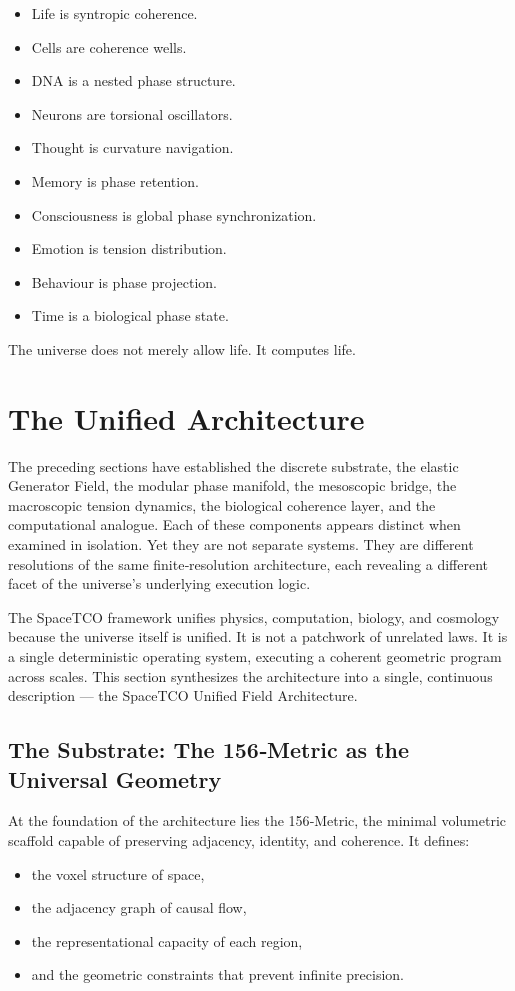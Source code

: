 \documentclass[reprint,amsmath,amssymb,aps,prl,floatfix]{revtex4-2}
\begin{document}
\begin{itemize}
\begin{itemize}
\item Life is syntropic coherence.
\item Cells are coherence wells.  
\item DNA is a nested phase structure.  
\item Neurons are torsional oscillators.  
\item Thought is curvature navigation.  
\item Memory is phase retention.  
\item Consciousness is global phase synchronization.  
\item Emotion is tension distribution.  
\item Behaviour is phase projection.  
\item Time is a biological phase state.
\end{itemize}
\medskip
The universe does not merely allow life.  
It computes life.

\section{The Unified Architecture}

The preceding sections have established the discrete substrate, the elastic Generator Field, the modular phase manifold, the mesoscopic bridge, the macroscopic tension dynamics, the biological coherence layer, and the computational analogue. Each of these components appears distinct when examined in isolation. Yet they are not separate systems. They are different resolutions of the same finite‑resolution architecture, each revealing a different facet of the universe’s underlying execution logic.
\medskip

The SpaceTCO framework unifies physics, computation, biology, and cosmology because the universe itself is unified. It is not a patchwork of unrelated laws. It is a single deterministic operating system, executing a coherent geometric program across scales. This section synthesizes the architecture into a single, continuous description — the SpaceTCO Unified Field Architecture.

\subsection{The Substrate: The 156‑Metric as the Universal Geometry}

At the foundation of the architecture lies the 156‑Metric, the minimal volumetric scaffold capable of preserving adjacency, identity, and coherence. It defines:
\begin{itemize}
\item the voxel structure of space,  
\item the adjacency graph of causal flow,  
\item the representational capacity of each region,  
\item and the geometric constraints that prevent infinite precision.
\end{itemize}
\medskip


\end{itemize}
\end{document}
